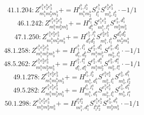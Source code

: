 \documentclass[letterpaper,10pt,fleqn,leqno,onecolumn]{article}
\begin{document}
\begin{equation} \;\;\;\;\;\;  41.1.204: Z^{e_{1}^{b}e_{2}^{b}e_{3}^{b}}_{m_{1}^{b}m_{2}^{b}m_{3}^{b}}+=H^{l_{1}^{b},l_{2}^{b}}_{m_{1}^{b}m_{2}^{b}}S^{e_{1}^{b}}_{l_{1}^{b}}S^{e_{2}^{b}e_{3}^{b}}_{m_{3}^{b},l_{2}^{b}}\cdot -1/1 \end{equation}
\begin{equation} \;\;\;\;\;\;  46.1.242: Z^{e_{1}^{b}e_{2}^{b}e_{3}^{b}}_{m_{1}^{b}m_{2}^{b}m_{3}^{b}}+=H^{l_{1}^{b}}_{d_{1}^{b}}S^{e_{1}^{b}e_{2}^{b}}_{m_{1}^{b},l_{1}^{b}}S^{e_{3}^{b},d_{1}^{b}}_{m_{2}^{b}m_{3}^{b}} \end{equation}
\begin{equation} \;\;\;\;\;\;  47.1.250: Z^{e_{1}^{b}e_{2}^{b}e_{3}^{b}}_{m_{1}^{b}m_{2}^{b}m_{3}^{b}}+=H^{e_{1}^{b},l_{1}^{b}}_{d_{1}^{b}d_{2}^{b}}S^{e_{2}^{b}e_{3}^{b}}_{m_{1}^{b},l_{1}^{b}}S^{d_{1}^{b}d_{2}^{b}}_{m_{2}^{b}m_{3}^{b}} \end{equation}
\begin{equation} \;\;\;\;\;\;  48.1.258: Z^{e_{1}^{b}e_{2}^{b}e_{3}^{b}}_{m_{1}^{b}m_{2}^{b}m_{3}^{b}}+=H^{e_{1}^{b},l_{1}^{b}}_{d_{1}^{b},d_{2}^{b}}S^{e_{2}^{b},d_{1}^{b}}_{m_{1}^{b}m_{2}^{b}}S^{e_{3}^{b},d_{2}^{b}}_{m_{3}^{b},l_{1}^{b}}\cdot -1/1 \end{equation}
\begin{equation} \;\;\;\;\;\;  48.5.262: Z^{e_{1}^{b}e_{2}^{b}e_{3}^{b}}_{m_{1}^{b}m_{2}^{b}m_{3}^{b}}+=H^{e_{1}^{b},l_{1}^{a}}_{d_{1}^{b},d_{1}^{a}}S^{e_{2}^{b},d_{1}^{b}}_{m_{1}^{b}m_{2}^{b}}S^{e_{3}^{b},d_{1}^{a}}_{m_{3}^{b},l_{1}^{a}}\cdot -1/1 \end{equation}
\begin{equation} \;\;\;\;\;\;  49.1.278: Z^{e_{1}^{b}e_{2}^{b}e_{3}^{b}}_{m_{1}^{b}m_{2}^{b}m_{3}^{b}}+=H^{l_{1}^{b},l_{2}^{b}}_{m_{1}^{b},d_{1}^{b}}S^{e_{1}^{b}e_{2}^{b}}_{m_{2}^{b},l_{1}^{b}}S^{e_{3}^{b},d_{1}^{b}}_{m_{3}^{b},l_{2}^{b}} \end{equation}
\begin{equation} \;\;\;\;\;\;  49.5.282: Z^{e_{1}^{b}e_{2}^{b}e_{3}^{b}}_{m_{1}^{b}m_{2}^{b}m_{3}^{b}}+=H^{l_{1}^{b},l_{1}^{a}}_{m_{1}^{b},d_{1}^{a}}S^{e_{1}^{b}e_{2}^{b}}_{m_{2}^{b},l_{1}^{b}}S^{e_{3}^{b},d_{1}^{a}}_{m_{3}^{b},l_{1}^{a}} \end{equation}
\begin{equation} \;\;\;\;\;\;  50.1.298: Z^{e_{1}^{b}e_{2}^{b}e_{3}^{b}}_{m_{1}^{b}m_{2}^{b}m_{3}^{b}}+=H^{l_{1}^{b}l_{2}^{b}}_{m_{1}^{b},d_{1}^{b}}S^{e_{1}^{b}e_{2}^{b}}_{l_{1}^{b}l_{2}^{b}}S^{e_{3}^{b},d_{1}^{b}}_{m_{2}^{b}m_{3}^{b}}\cdot -1/1 \end{equation}
\end{document}
